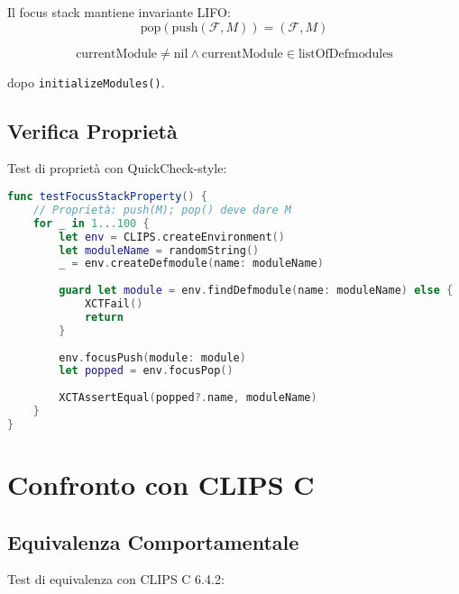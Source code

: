 \begin{proposizione}
Il focus stack mantiene invariante LIFO:
\begin{equation}
\text{pop}(\text{push}(\mathcal{F}, M)) = (\mathcal{F}, M)
\end{equation}
\end{proposizione}

\begin{proposizione}
\begin{equation}
\text{currentModule} \neq \text{nil} \land \text{currentModule} \in \text{listOfDefmodules}
\end{equation}

dopo \texttt{initializeModules()}.
\end{proposizione}

\subsection{Verifica Proprietà}

Test di proprietà con QuickCheck-style:

\begin{lstlisting}[language=Swift]
func testFocusStackProperty() {
    // Proprietà: push(M); pop() deve dare M
    for _ in 1...100 {
        let env = CLIPS.createEnvironment()
        let moduleName = randomString()
        _ = env.createDefmodule(name: moduleName)
        
        guard let module = env.findDefmodule(name: moduleName) else {
            XCTFail()
            return
        }
        
        env.focusPush(module: module)
        let popped = env.focusPop()
        
        XCTAssertEqual(popped?.name, moduleName)
    }
}
\end{lstlisting}

\section{Confronto con CLIPS C}

\subsection{Equivalenza Comportamentale}

Test di equivalenza con CLIPS C 6.4.2:

